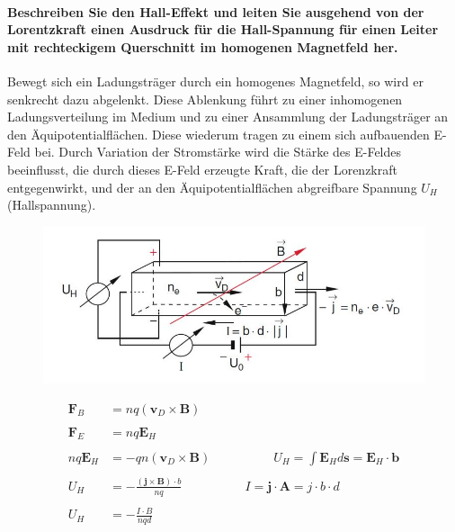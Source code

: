 \documentclass[a4paper, 11pt, ngerman, parskip=half-]{scrartcl}
\begin{document}
\paragraph{Beschreiben Sie den Hall-Effekt und leiten Sie ausgehend von der Lorentzkraft einen
    Ausdruck für die Hall-Spannung für einen Leiter mit rechteckigem Querschnitt im homogenen Magnetfeld
    her.}
Bewegt sich ein Ladungsträger durch ein homogenes Magnetfeld, so wird er senkrecht dazu abgelenkt. Diese Ablenkung führt zu einer inhomogenen Ladungsverteilung im Medium und zu einer Ansammlung der Ladungsträger an den Äquipotentialflächen.
Diese wiederum tragen zu einem sich aufbauenden E-Feld bei. Durch Variation der Stromstärke wird die Stärke des E-Feldes beeinflusst, die durch dieses E-Feld erzeugte Kraft, die der Lorenzkraft entgegenwirkt, und der an den Äquipotentialflächen abgreifbare Spannung $U_H$ (Hallspannung).
\begin{figure}[H]
    \includegraphics{image/05/5.8.JPG}
\end{figure}
\begin{align}
    \textbf{F}_B    & = nq(\textbf{v}_D \times \textbf{B})                                                                                      \\
    \\
    \textbf{F}_E    & = nq \textbf{E}_H                                                                                                         \\
    \\
    nq \textbf{E}_H & = -qn(\textbf{v}_D \times \textbf{B}) \hspace{5em} U_H = \int \textbf{E}_H d\textbf{s} = \textbf{E}_H \cdot \textbf{b}    \\
    \\
    U_H             & = - \frac{(\textbf{j} \times \textbf{B})\cdot b} {nq}      \hspace{5em} I = \textbf{j}\cdot \textbf{A} = j\cdot b \cdot d \\
    \\
    U_H             & = -\frac{I\cdot B}{nqd}
\end{align}
\end{document}
